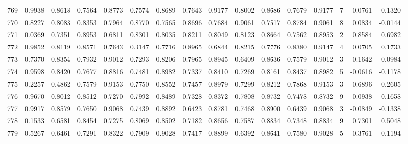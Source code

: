 \begin{tabular}{lrrrrrrrrrrrrrrr}
769 &      0.9938 &  0.8618 &  0.7564 &  0.8773 &  0.7574 &  0.8689 &  0.7643 &  0.9177 &  0.8002 &  0.8686 &   0.7679 &     0.9177 &      7 &                   -0.0761 &                    -0.1320 \\
770 &      0.8227 &  0.8083 &  0.8353 &  0.7964 &  0.8770 &  0.7565 &  0.8696 &  0.7684 &  0.9061 &  0.7517 &   0.8784 &     0.9061 &      8 &                    0.0834 &                    -0.0144 \\
771 &      0.0369 &  0.7351 &  0.8953 &  0.6811 &  0.8301 &  0.8035 &  0.8211 &  0.8049 &  0.8123 &  0.8664 &   0.7562 &     0.8953 &      2 &                    0.8584 &                     0.6982 \\
772 &      0.9852 &  0.8119 &  0.8571 &  0.7643 &  0.9147 &  0.7716 &  0.8965 &  0.6844 &  0.8215 &  0.7776 &   0.8380 &     0.9147 &      4 &                   -0.0705 &                    -0.1733 \\
773 &      0.7370 &  0.8354 &  0.7932 &  0.9012 &  0.7293 &  0.8206 &  0.7965 &  0.8945 &  0.6409 &  0.8636 &   0.7579 &     0.9012 &      3 &                    0.1642 &                     0.0984 \\
774 &      0.9598 &  0.8420 &  0.7677 &  0.8816 &  0.7481 &  0.8982 &  0.7337 &  0.8410 &  0.7269 &  0.8161 &   0.8437 &     0.8982 &      5 &                   -0.0616 &                    -0.1178 \\
775 &      0.2257 &  0.4862 &  0.7579 &  0.9153 &  0.7750 &  0.8552 &  0.7457 &  0.8979 &  0.7299 &  0.8212 &   0.7868 &     0.9153 &      3 &                    0.6896 &                     0.2605 \\
776 &      0.9670 &  0.8012 &  0.8512 &  0.7270 &  0.7992 &  0.8489 &  0.7328 &  0.8372 &  0.7808 &  0.8732 &   0.7478 &     0.8732 &      9 &                   -0.0938 &                    -0.1658 \\
777 &      0.9917 &  0.8579 &  0.7650 &  0.9068 &  0.7439 &  0.8892 &  0.6423 &  0.8781 &  0.7468 &  0.8900 &   0.6439 &     0.9068 &      3 &                   -0.0849 &                    -0.1338 \\
778 &      0.1533 &  0.6581 &  0.8454 &  0.7275 &  0.8069 &  0.8502 &  0.7182 &  0.8656 &  0.7587 &  0.8834 &   0.7348 &     0.8834 &      9 &                    0.7301 &                     0.5048 \\
779 &      0.5267 &  0.6461 &  0.7291 &  0.8322 &  0.7909 &  0.9028 &  0.7417 &  0.8899 &  0.6392 &  0.8641 &   0.7580 &     0.9028 &      5 &                    0.3761 &                     0.1194 \\

\end{tabular}

